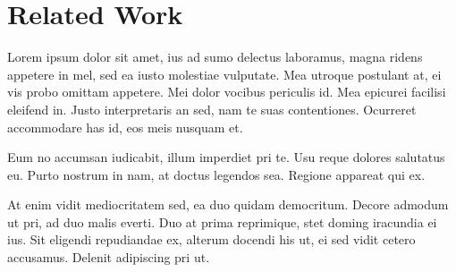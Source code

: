 \section{Related Work}

Lorem ipsum dolor sit amet, ius ad sumo delectus laboramus, magna ridens appetere in mel, sed ea iusto molestiae vulputate. Mea utroque postulant at, ei vis probo omittam appetere. Mei dolor vocibus periculis id. Mea epicurei facilisi eleifend in. Justo interpretaris an sed, nam te suas contentiones. Ocurreret accommodare has id, eos meis nusquam et.

Eum no accumsan iudicabit, illum imperdiet pri te. Usu reque dolores salutatus eu. Purto nostrum in nam, at doctus legendos sea. Regione appareat qui ex.

At enim vidit mediocritatem sed, ea duo quidam democritum. Decore admodum ut pri, ad duo malis everti. Duo at prima reprimique, stet doming iracundia ei ius. Sit eligendi repudiandae ex, alterum docendi his ut, ei sed vidit cetero accusamus. Delenit adipiscing pri ut.